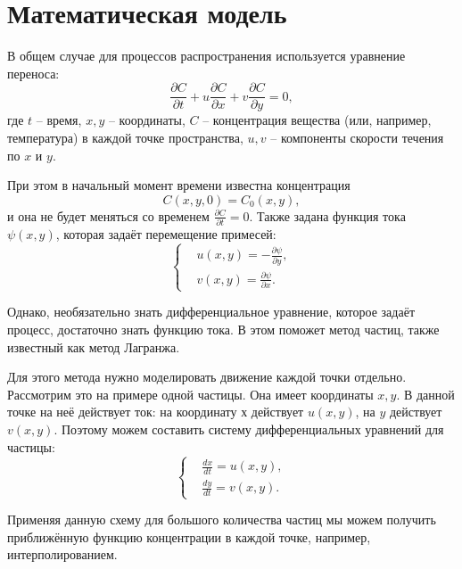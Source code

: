\section{Математическая модель}
    В общем случае для процессов распространения используется уравнение переноса:
    \[
        \frac{\partial C}{\partial t} + u \frac{\partial C}{\partial x} + v \frac{\partial C}{\partial y} = 0,
    \]
    где \( t \) -- время, \( x, y \) -- координаты, \( C \) -- концентрация вещества (или, например, температура) в каждой точке пространства, \( u, v \) -- компоненты скорости течения по \( x \) и \( y \). 
    
    При этом в начальный момент времени известна концентрация
    \[
        C(x, y, 0) = C_0 (x, y),
    \]
    и она не будет меняться со временем \( \frac{\partial C}{\partial t} = 0 \). Также задана функция тока \( \psi(x, y) \), которая задаёт перемещение примесей: 
    \[
        \left\{
            \begin{split}
                & u(x, y) = -\frac{\partial \psi}{\partial y}, \\
                & v(x, y) = \frac{\partial \psi}{\partial x}.
            \end{split}
        \right.
    \]

    Однако, необязательно знать дифференциальное уравнение, которое задаёт процесс, достаточно знать функцию тока. В этом поможет метод частиц, также известный как метод Лагранжа.

    Для этого метода нужно моделировать движение каждой точки отдельно. Рассмотрим это на примере одной частицы. Она имеет координаты \( x, y \). В данной точке на неё действует ток: на координату \( х \) действует \( u(x, y) \), на \( y \) действует \( v(x, y) \). Поэтому можем составить систему дифференциальных уравнений для частицы:
    \[
        \left\{
            \begin{split}
                & \frac{dx}{dt} = u(x, y), \\
                & \frac{dy}{dt} = v(x, y).
            \end{split}
        \right.
    \]

    Применяя данную схему для большого количества частиц мы можем получить приближённую функцию концентрации в каждой точке, например, интерполированием.